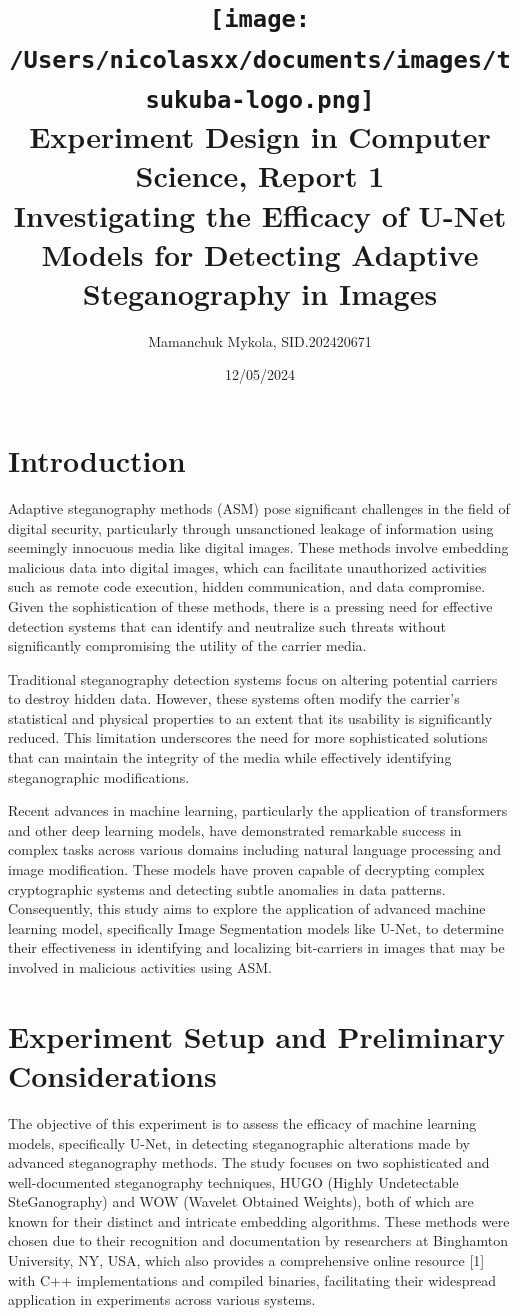 \documentclass[12pt,a4paper]{article}
\title{
    \texttt{[image: /Users/nicolasxx/documents/images/tsukuba-logo.png]} \\
    \textbf{Experiment Design in Computer Science, Report 1} \\
    \vspace{3mm}    
    Investigating the Efficacy of U-Net Models for Detecting Adaptive Steganography in Images
}
\author{Mamanchuk Mykola, SID.202420671}
\date{12/05/2024}
\begin{document}
\maketitle

\section{Introduction}

Adaptive steganography methods (ASM) pose significant challenges in the field of digital security, particularly through unsanctioned leakage of information using seemingly innocuous media like digital images. These methods involve embedding malicious data into digital images, which can facilitate unauthorized activities such as remote code execution, hidden communication, and data compromise. Given the sophistication of these methods, there is a pressing need for effective detection systems that can identify and neutralize such threats without significantly compromising the utility of the carrier media.

Traditional steganography detection systems focus on altering potential carriers to destroy hidden data. However, these systems often modify the carrier's statistical and physical properties to an extent that its usability is significantly reduced. This limitation underscores the need for more sophisticated solutions that can maintain the integrity of the media while effectively identifying steganographic modifications.

Recent advances in machine learning, particularly the application of transformers and other deep learning models, have demonstrated remarkable success in complex tasks across various domains including natural language processing and image modification. These models have proven capable of decrypting complex cryptographic systems and detecting subtle anomalies in data patterns. Consequently, this study aims to explore the application of advanced machine learning model, specifically Image Segmentation models like U-Net, to determine their effectiveness in identifying and localizing bit-carriers in images that may be involved in malicious activities using ASM.

\section{Experiment Setup and Preliminary Considerations}

The objective of this experiment is to assess the efficacy of machine learning models, specifically U-Net, in detecting steganographic alterations made by advanced steganography methods. The study focuses on two sophisticated and well-documented steganography techniques, HUGO (Highly Undetectable SteGanography) and WOW (Wavelet Obtained Weights), both of which are known for their distinct and intricate embedding algorithms. These methods were chosen due to their recognition and documentation by researchers at Binghamton University, NY, USA, which also provides a comprehensive online resource [1] with C++ implementations and compiled binaries, facilitating their widespread application in experiments across various systems.
\end{document}
